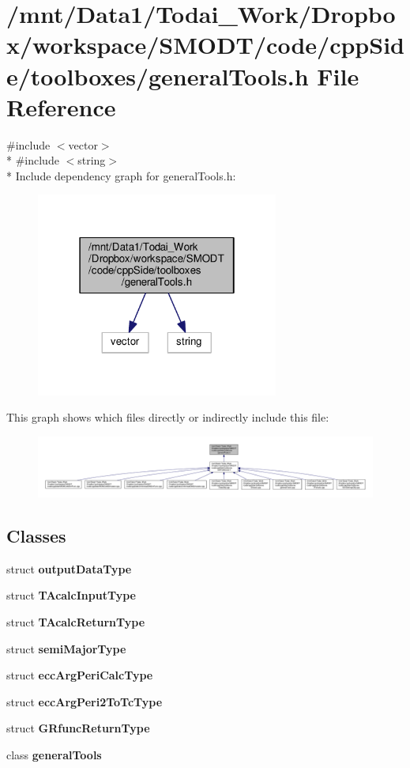 \section{/mnt/\-Data1/\-Todai\-\_\-\-Work/\-Dropbox/workspace/\-S\-M\-O\-D\-T/code/cpp\-Side/toolboxes/general\-Tools.h File Reference}
\label{general_tools_8h}
{\ttfamily \#include $<$vector$>$}\\*
{\ttfamily \#include $<$string$>$}\\*
Include dependency graph for general\-Tools.\-h\-:\nopagebreak
\begin{figure}[H]
\begin{center}
\leavevmode
\includegraphics[width=226pt]{general_tools_8h__incl}
\end{center}
\end{figure}
This graph shows which files directly or indirectly include this file\-:\nopagebreak
\begin{figure}[H]
\begin{center}
\leavevmode
\includegraphics[width=350pt]{general_tools_8h__dep__incl}
\end{center}
\end{figure}
\subsection*{Classes}
\begin{DoxyCompactItemize}
\item 
struct {\bf output\-Data\-Type}
\item 
struct {\bf T\-Acalc\-Input\-Type}
\item 
struct {\bf T\-Acalc\-Return\-Type}
\item 
struct {\bf semi\-Major\-Type}
\item 
struct {\bf ecc\-Arg\-Peri\-Calc\-Type}
\item 
struct {\bf ecc\-Arg\-Peri2\-To\-Tc\-Type}
\item 
struct {\bf G\-Rfunc\-Return\-Type}
\item 
class {\bf general\-Tools}
\end{DoxyCompactItemize}
